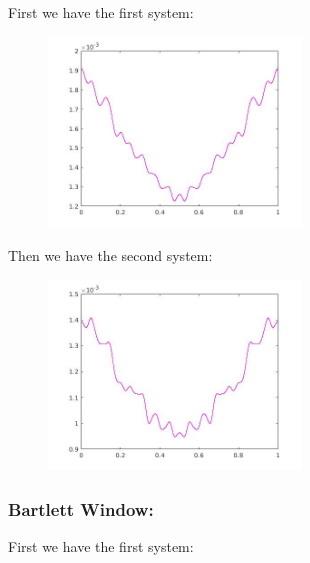 \documentclass[a4paper,11pt]{article}
\begin{document}
First we have the first system:

\begin{figure}[!hp]
    \begin{center}
    \includegraphics[width=0.6\textwidth]{images/lab4_27.jpg}
    \end{center}
\end{figure}

Then we have the second system:

\begin{figure}[!hp]
    \begin{center}
    \includegraphics[width=0.6\textwidth]{images/lab4_37.jpg}
    \end{center}
\end{figure}

\newpage

\subsubsection{Bartlett Window:}

First we have the first system:
\end{document}
